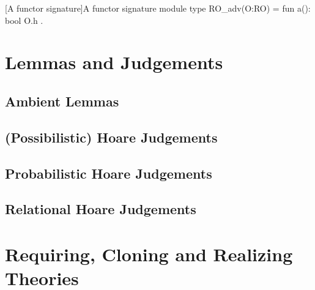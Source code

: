 \begin{easycrypt}[label={lst:functorsig}]{[A functor signature]A functor signature}
module type RO_adv(O:RO) = {
  fun a(): bool { O.h }
}.
\end{easycrypt}

\section{Lemmas and Judgements}

\subsection{Ambient Lemmas}

\subsection{(Possibilistic) Hoare Judgements}

\subsection{Probabilistic Hoare Judgements}

\subsection{Relational Hoare Judgements}

\section{Requiring, Cloning and Realizing Theories\label{sec:cloning}}

